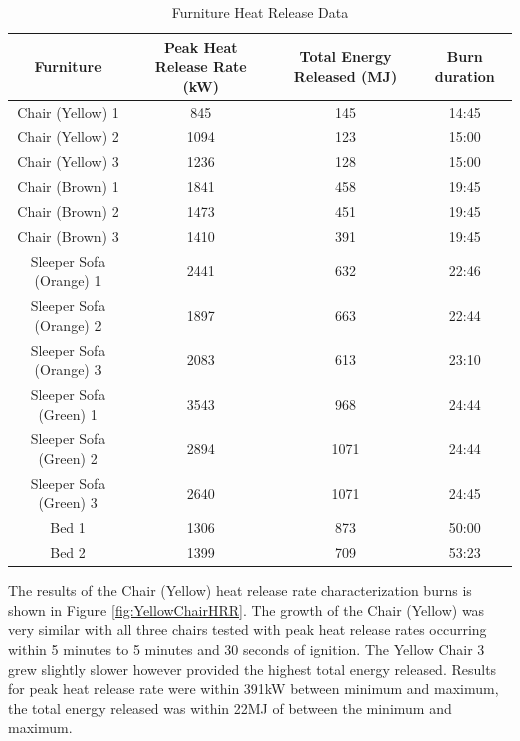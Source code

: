 \documentclass{article}
\begin{document}
\begin{table}[H]
	\caption{Furniture Heat Release Data}
	\begin{tabular}{|c|c|c|c|}
		\hline
		Furniture & Peak Heat Release Rate (kW) & Total Energy Released (MJ) & Burn duration \\ \hline \hline
		Chair (Yellow) 1 & 845 & 145 & 14:45 \\ \hline
		Chair (Yellow) 2 & 1094 & 123 & 15:00 \\ \hline
		Chair (Yellow) 3 & 1236 & 128 & 15:00 \\ \hline
		Chair (Brown) 1 & 1841 & 458 & 19:45 \\ \hline
		Chair (Brown) 2 & 1473 & 451 & 19:45 \\ \hline
		Chair (Brown) 3 & 1410 & 391 & 19:45 \\ \hline
		Sleeper Sofa (Orange) 1  & 2441 & 632 & 22:46 \\ \hline
		Sleeper Sofa (Orange) 2  & 1897 & 663 & 22:44 \\ \hline
		Sleeper Sofa (Orange) 3  & 2083 & 613 & 23:10 \\ \hline
		Sleeper Sofa (Green) 1  & 3543 & 968 & 24:44 \\ \hline
		Sleeper Sofa (Green) 2  & 2894 & 1071 & 24:44 \\ \hline
		Sleeper Sofa (Green) 3  & 2640 & 1071 & 24:45 \\ \hline
		Bed 1 & 1306 & 873 & 50:00 \\ \hline
		Bed 2 & 1399 & 709 & 53:23 \\ \hline
	\end{tabular}
	\label{table:FurnitureHRR_Data}
\end{table}

The results of the Chair (Yellow) heat release rate characterization burns is shown in Figure \ref{fig:YellowChairHRR}. The growth of the Chair (Yellow) was very similar with all three chairs tested with peak heat release rates occurring within 5 minutes to 5 minutes and 30 seconds of ignition. The Yellow Chair 3 grew slightly slower however provided the highest total energy released. Results for peak heat release rate were within 391kW between minimum and maximum, the total energy released was within 22MJ of between the minimum and maximum. 
\end{document}

